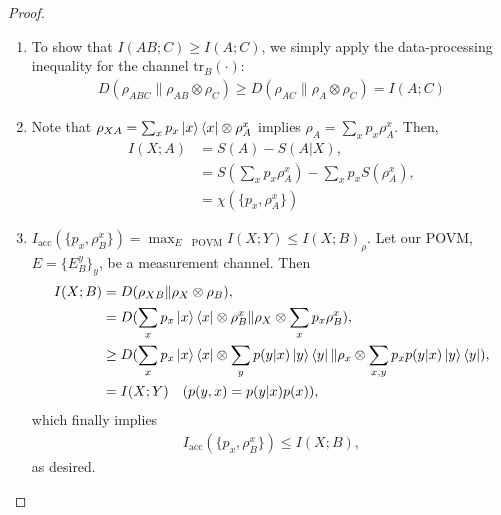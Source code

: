 \documentclass[notoc]{tufte-book}
\begin{document}
\begin{proof}
\begin{enumerate}
    \item To show that $I(AB;C)\geq I(A;C)$, we simply apply the data-processing inequality for the channel $\text{tr}_B(\cdot)$:\begin{align}
        D(\rho_{ABC}\| \rho_{AB}\otimes \rho_C) \geq D(\rho_{AC}\|\rho_A \otimes \rho_C)= I(A;C)
    \end{align}
    \item Note that $\rho_{XA} = \sum_x p_x \ket{x}\bra{x}\otimes \rho_A^x$ implies $\rho_A=\sum_x p_x \rho_A^x$. Then,
    \begin{align}
        I(X;A) &=S(A)-S(A|X),\\
        &=S(\sum_x p_x \rho_A^x)-\sum_x p_x S(\rho_A^x),\\
    &=\chi(\{p_x,\rho_A^x\})
    \end{align}
    \item $I_{\text{acc}}(\{p_x,\rho_B^x\}) = \max_{E \quad \text{POVM}} I(X;Y) \leq I(X;B)_{\rho}$. Let our POVM, $E=\{E_B^y\}_y$, be a measurement channel. Then
    \begin{align}
        I(X;B) &= D(\rho_{XB} \| \rho_X \otimes \rho_B),\\
        &=D(\sum_x p_x \ket{x}\bra{x} \otimes \rho_B^x \| \rho_X \otimes \sum_x p_x \rho_B^x),\\
        &\geq D(\sum_x p_x \ket{x}\bra{x} \otimes \sum_y p(y|x)\ket{y}\bra{y} \| \rho_x \otimes \sum_{x,y}p_x p(y|x)\ket{y}\bra{y}),\\
        &=I(X;Y) \quad (p(y,x)=p(y|x)p(x)),
    \end{align}
    which finally implies 
    \begin{align}
     I_{\text{acc}}(\{p_x, \rho_B^x\}) \leq I(X;B),
    \end{align}
    as desired.
\end{enumerate}
\end{proof}








\backmatter

%
%

\printindex
\end{document}
